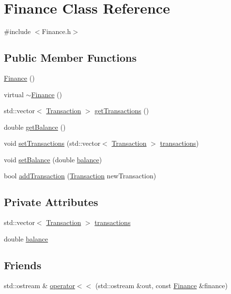 \hypertarget{classFinance}{}\section{Finance Class Reference}
\label{classFinance}


{\ttfamily \#include $<$Finance.\+h$>$}

\subsection*{Public Member Functions}
\begin{DoxyCompactItemize}
\item 
\hyperlink{classFinance_a0b739d7b6e4c3fbf1851d481e2771eb2}{Finance} ()
\item 
virtual \hyperlink{classFinance_a1e8ee7cfd4d1c4199bad7309ea24814b}{$\sim$\+Finance} ()
\item 
std\+::vector$<$ \hyperlink{classTransaction}{Transaction} $>$ \hyperlink{classFinance_a66837a67f11d3f535443437f059aee6d}{get\+Transactions} ()
\item 
double \hyperlink{classFinance_a6d7848d3d6ec4911d80ff62474172c36}{get\+Balance} ()
\item 
void \hyperlink{classFinance_ac21f2484c60fa79241348539562aa871}{set\+Transactions} (std\+::vector$<$ \hyperlink{classTransaction}{Transaction} $>$ \hyperlink{classFinance_a09c32851f7aa143176bbd995e096f34e}{transactions})
\item 
void \hyperlink{classFinance_acfb28629a949cb12a95be1099fa682c4}{set\+Balance} (double \hyperlink{classFinance_ac239c4085777ca86ba45c4c8d6723926}{balance})
\item 
bool \hyperlink{classFinance_a64c98d636692c83e875fad949e0feb69}{add\+Transaction} (\hyperlink{classTransaction}{Transaction} new\+Transaction)
\end{DoxyCompactItemize}
\subsection*{Private Attributes}
\begin{DoxyCompactItemize}
\item 
std\+::vector$<$ \hyperlink{classTransaction}{Transaction} $>$ \hyperlink{classFinance_a09c32851f7aa143176bbd995e096f34e}{transactions}
\item 
double \hyperlink{classFinance_ac239c4085777ca86ba45c4c8d6723926}{balance}
\end{DoxyCompactItemize}
\subsection*{Friends}
\begin{DoxyCompactItemize}
\item 
std\+::ostream \& \hyperlink{classFinance_a87860657710fe8b96d9c6a0ff13a312e}{operator$<$$<$} (std\+::ostream \&out, const \hyperlink{classFinance}{Finance} \&finance)
\end{DoxyCompactItemize}


